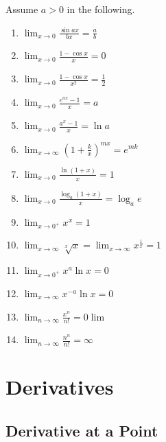 \documentclass[a4paper,11pt]{article}
\theoremstyle{definition}
\theoremstyle{plain}
\theoremstyle{remark}
\begin{document}
\begin{tcolorbox}
    Assume $a > 0$ in the following.
    
    \begin{multicols}{2}
        \begin{enumerate}
            \item \( \lim_{x \to 0} \frac{\sin ax}{bx} = \frac{a}{b} \)
            \item \( \lim_{x \to 0} \frac{1 - \cos x}{x} = 0 \)
            \item \( \lim_{x \to 0} \frac{1 - \cos x}{x^2} = \frac{1}{2} \)
            \item \( \lim_{x \to 0} \frac{e^{ax} - 1}{x} = a \)
            \item \( \lim_{x \to 0} \frac{a^x - 1}{x} = \ln a \)
            \item \( \lim_{x \to \infty} \left(1 + \frac{k}{x}\right)^{mx} = e^{mk} \)
            \item \( \lim_{x \to 0} \frac{\ln(1 + x)}{x} = 1 \)
            \item \( \lim_{x \to 0} \frac{\log_a(1 + x)}{x} = \log_a e \)
            \item \( \lim_{x \to 0^+} x^x = 1 \)
            \item \( \lim_{x \to \infty} \sqrt[x]{x} = \lim_{x \to \infty} x^{\frac{1}{x}} = 1 \)
            \item \( \lim_{x \to 0^+} x^a \ln x = 0 \)
            \item \( \lim_{x \to \infty} x^{-a} \ln x = 0 \)
            \item \( \lim_{n \to \infty} \frac{x^n}{n!} = 0 \lim\limits \)
            \item \( \lim_{n \to \infty} \frac{n^n}{n!} = \infty \)
        \end{enumerate}
    \end{multicols}
        
\end{tcolorbox}




\section{Derivatives}




\subsection{Derivative at a Point}
\end{document}
